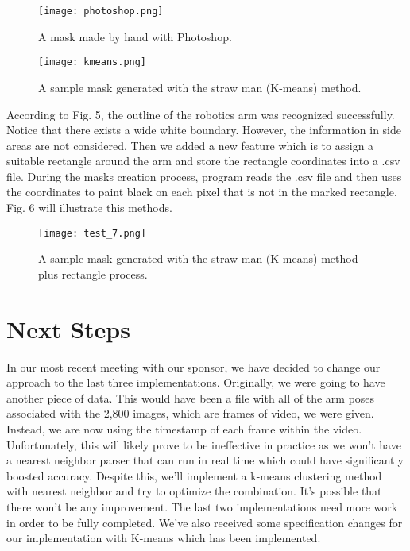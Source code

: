 \documentclass[10pt,journal,compsoc, draftclsnofoot,onecolumn]{IEEEtran}
\begin{document}
\begin{figure}[H]
 \begin{center}
    \texttt{[image: photoshop.png]}
 \end{center}
 \caption{A mask made by hand with Photoshop.}
\end{figure}


\begin{figure}[H]
  \begin{center}
    \texttt{[image: kmeans.png]}
  \end{center}
  \caption{A sample mask generated with the straw man (K-means) method.}
\end{figure}

\noindent According to Fig. 5, the outline of the robotics arm was recognized successfully. Notice that there exists a wide white boundary. However, the information in side areas are not considered. Then we added a new feature which is to assign a suitable rectangle around the arm and store the rectangle coordinates into a .csv file. During the masks creation process, program reads the .csv file and then uses the coordinates to paint black on each pixel that is not in the marked rectangle. Fig. 6 will illustrate this methods. 

\begin{figure}[H]
  \begin{center}
    \texttt{[image: test\_7.png]}
  \end{center}
  \caption{A sample mask generated with the straw man (K-means) method plus rectangle process.}
\end{figure}


\section{Next Steps}
In our most recent meeting with our sponsor, we have decided to change our approach to the last three implementations.
Originally, we were going to have another piece of data.
This would have been a file with all of the arm poses associated with the 2,800 images, which are frames of video, we were given.
Instead, we are now using the timestamp of each frame within the video.
Unfortunately, this will likely prove to be ineffective in practice as we won't have a nearest neighbor parser that can run in real time which could have significantly boosted accuracy.
Despite this, we'll implement a k-means clustering method with nearest neighbor and try to optimize the combination.
It's possible that there won't be any improvement.
The last two implementations need more work in order to be fully completed.
We've also received some specification changes for our implementation with K-means which has been implemented.
\end{document}
